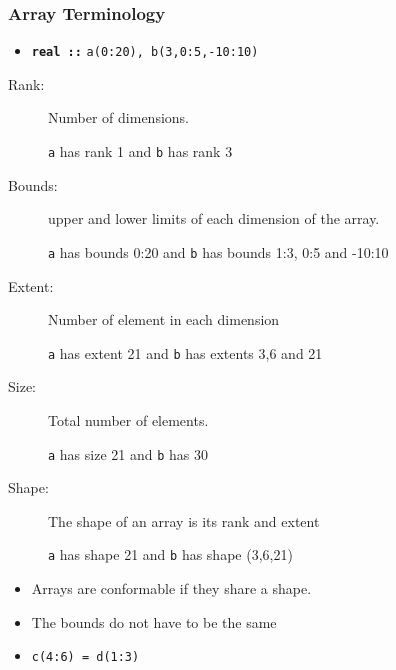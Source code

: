 \documentclass[slidestop,mathserif,compress,xcolor=svgnames]{beamer}
\begin{document}
\begin{frame}
  \frametitle{\small Array Terminology}
    \begin{block}{}
      \begin{itemize}
        \item[] \texttt{\textbf{real ::}} \texttt{a(0:20), b(3,0:5,-10:10)}
      \end{itemize}
      \begin{description}
        \item[Rank:] Number of dimensions.
        \item[] {\texttt{a}} has rank 1 and {\texttt{b}} has rank 3
        \item[Bounds:] upper and lower limits of each dimension of the array.
        \item[] {\texttt{a}} has bounds 0:20 and {\texttt{b}} has bounds 1:3, 0:5 and -10:10
        \item[Extent:] Number of element in each dimension
        \item[] {\texttt{a}} has extent 21 and {\texttt{b}} has extents 3,6 and 21
        \item[Size:] Total number of elements.
        \item[] {\texttt{a}} has size 21 and {\texttt{b}} has 30
        \item[Shape:] The shape of an array is its rank and extent
        \item[] \texttt{a} has shape 21 and \texttt{b} has shape (3,6,21)
      \end{description}
      \begin{itemize}
        \item Arrays are conformable if they share a shape.
        \item The bounds do not have to be the same
        \item[] \texttt{c(4:6) = d(1:3)}
      \end{itemize}
    \end{block}
\end{frame}
\end{document}
